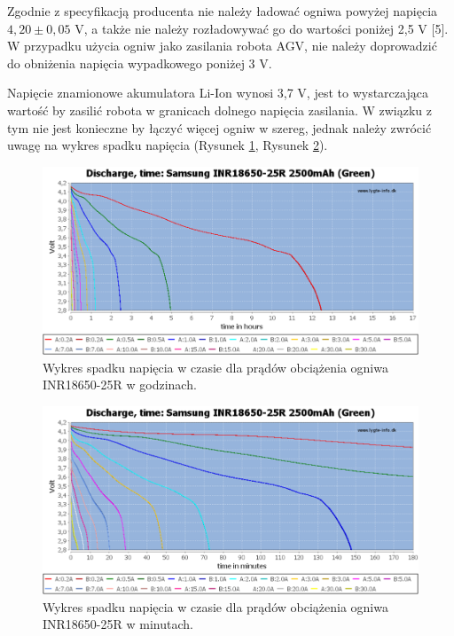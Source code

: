 \documentclass{report}
\begin{document}
\begin{enumerate}[label=(\Alph*)]
    Zgodnie z specyfikacją producenta nie należy ładować ogniwa powyżej napięcia $4,20 \pm 0,05$ V, a także nie należy rozładowywać go do wartości poniżej 2,5 V [5]. W przypadku użycia ogniw jako zasilania robota AGV, nie należy doprowadzić do obniżenia napięcia wypadkowego poniżej 3 V.
    
    Napięcie znamionowe akumulatora Li-Ion wynosi 3,7 V, jest to wystarczająca wartość by zasilić robota w granicach dolnego napięcia zasilania. W związku z tym nie jest konieczne by łączyć więcej ogniw w szereg, jednak należy zwrócić uwagę na wykres spadku napięcia (Rysunek \ref{fig:18650-h}, Rysunek \ref{fig:18650-m}).

    \begin{figure}[H]
        \centering
        \includegraphics{src/cells_charts/Li-ion discharge hours.png}
        \caption{Wykres spadku napięcia w czasie dla prądów obciążenia ogniwa INR18650-25R w godzinach.}
        \label{fig:18650-h}
    \end{figure}

    \begin{figure}[H]
        \centering
        \includegraphics{src/cells_charts/Li-ion discharge minutes.png}
        \caption{Wykres spadku napięcia w czasie dla prądów obciążenia ogniwa INR18650-25R w minutach.}
        \label{fig:18650-m}
    \end{figure}


\end{enumerate}
\end{document}
